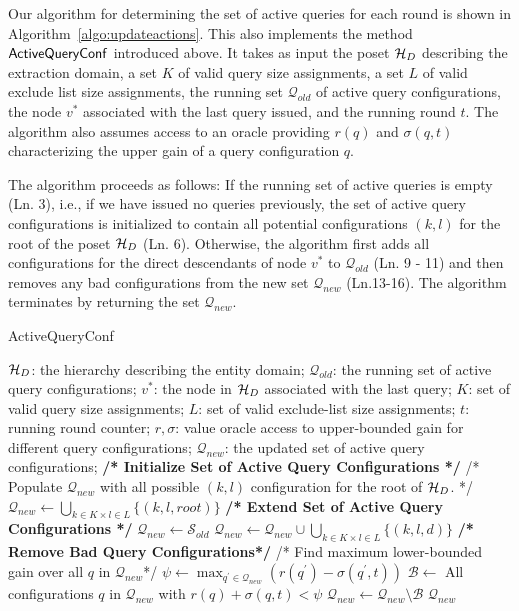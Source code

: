 Our algorithm for determining the set of active queries for each round is shown in Algorithm~\ref{algo:updateactions}. This also implements the method ${\sf ActiveQueryConf}$ introduced above. It takes as input the poset $\mathcal{H}_D$ describing the extraction domain, a set $K$ of valid query size assignments, a set $L$ of valid exclude list size assignments, the running set $\mathcal{Q}_{old}$ of active query configurations, the node $v^*$ associated with the last query issued, and the running round $t$. The algorithm also assumes access to an oracle providing $r(q)$ and $\sigma(q,t)$ characterizing the upper gain of a query configuration $q$.

The algorithm proceeds as follows: If the running set of active queries is empty (Ln. 3), i.e., if we have issued no queries previously, the set of active query configurations is initialized to contain all potential configurations $(k,l)$ for the root of the poset $\mathcal{H}_D$ (Ln. 6). Otherwise, the algorithm first adds all configurations for the direct descendants of node $v^*$ to $\mathcal{Q}_{old}$ (Ln. 9 - 11) and then removes any bad configurations from the new set $\mathcal{Q}_{new}$ (Ln.13-16). The algorithm terminates by returning the set $\mathcal{Q}_{new}$.

\begin{algorithm}[h]
\small\caption{ActiveQueryConf}
\label{algo:updateactions}
\begin{algorithmic}[1]
 $\mathcal{H}_D$: the hierarchy describing the entity domain; $\mathcal{Q}_{old}$: the running set of active query configurations; $v^*$: the node in $\mathcal{H}_D$ associated with the last query; $K$: set of valid query size assignments; $L$: set of valid exclude-list size assignments; $t$: running round counter; $r,\sigma$: value oracle access to upper-bounded gain for different query configurations;
 $\mathcal{Q}_{new}$: the updated set of active query configurations;
	\STATE \textbf{/* Initialize Set of Active Query Configurations */}
	\STATE /* Populate ${\mathcal{Q}_{new}}$ with all possible $(k,l)$ configuration for the root of $\mathcal{H}_D$. */
	\STATE ${\mathcal{Q}_{new}} \leftarrow \bigcup_{k \in K \times l \in L} \{ (k,l,root) \}$
\ELSE
	\STATE \textbf{/* Extend Set of Active Query Configurations */}
	\STATE $\mathcal{Q}_{new} \leftarrow \mathcal{S}_{old}$
	\STATE $\mathcal{Q}_{new} \leftarrow \mathcal{Q}_{new} \cup \bigcup_{k \in K \times l \in L} \{(k,l,d)\}$
	\ENDFOR
	\STATE \textbf{/* Remove Bad Query Configurations*/}
	\STATE /* Find maximum lower-bounded gain over all $q$ in $\mathcal{Q}_{new}$*/
	\STATE $\psi \leftarrow \max_{q^{\prime} \in \mathcal{Q}_{new}} (r(q^{\prime}) - \sigma(q^{\prime},t))$  
	\STATE $\mathcal{B} \leftarrow$ All configurations $q$ in $\mathcal{Q}_{new}$ with $r(q) + \sigma(q,t) < \psi$
	\STATE $\mathcal{Q}_{new} \leftarrow \mathcal{Q}_{new} \setminus \mathcal{B}$
\ENDIF 
\RETURN $\mathcal{Q}_{new}$
\end{algorithmic}
\end{algorithm}
\vspace{-5pt}
